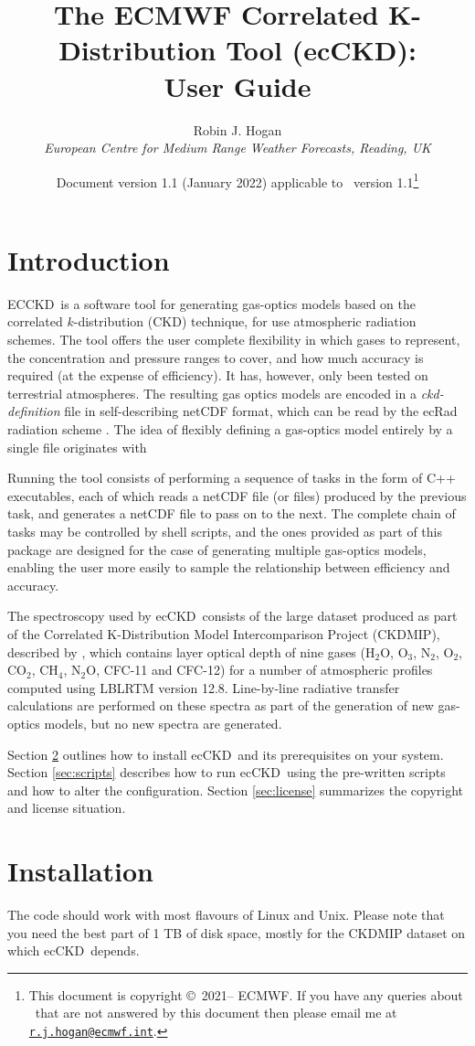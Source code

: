 \documentclass[a4,oneside]{article}
\title{The ECMWF Correlated K-Distribution Tool (ecCKD): \\ User Guide}
\author{Robin J. Hogan\\ \emph{European Centre for Medium Range
    Weather Forecasts, Reading, UK}}
\date{Document version 1.1 (January 2022) applicable to 
  \ecckd\ version 1.1\thanks{This document is copyright
    \copyright\ 2021-- ECMWF. If you have any queries about
    \ecckd\ that are not answered by this document
%
%
    then please email me at
    \href{mailto:r.j.hogan@ecmwf.int}{\texttt{r.j.hogan@ecmwf.int}}.}}
\newcommand{\ecckd}{ecCKD}
\newcommand{\Ecckd}{ECCKD}
\begin{document}
\maketitle

\section{Introduction}
\Ecckd\ is a software tool for generating gas-optics models based on
the correlated $k$-distribution (CKD) technique, for use atmospheric
radiation schemes. The tool offers the user complete flexibility in
which gases to represent, the concentration and pressure ranges to
cover, and how much accuracy is required (at the expense of
efficiency). It has, however, only been tested on terrestrial
atmospheres.  The resulting gas optics models are encoded in a
\emph{ckd-definition} file in self-describing netCDF format,
which can be read by the ecRad radiation scheme
\citep{Hogan&2018}. The idea of flexibly defining a gas-optics model
entirely by a single file originates with \cite{Edwards&1996}

Running the tool consists of performing a sequence of tasks in the
form of C++ executables, each of which reads a netCDF file (or files)
produced by the previous task, and generates a netCDF file to pass on
to the next. The complete chain of tasks may be controlled by shell
scripts, and the ones provided as part of this package are designed
for the case of generating multiple gas-optics models, enabling the
user more easily to sample the relationship between efficiency and
accuracy.

The spectroscopy used by \ecckd\ consists of the large dataset
produced as part of the Correlated K-Distribution Model
Intercomparison Project (CKDMIP), described by \cite{Hogan&2020},
which contains layer optical depth of nine gases (H$_2$O, O$_3$,
N$_2$, O$_2$, CO$_2$, CH$_4$, N$_2$O, CFC-11 and CFC-12) for a number
of atmospheric profiles computed using LBLRTM version
12.8. Line-by-line radiative transfer calculations are performed on
these spectra as part of the generation of new gas-optics models, but
no new spectra are generated.

Section \ref{sec:installation} outlines how to install \ecckd\ and its
prerequisites on your system. Section \ref{sec:scripts} describes how
to run \ecckd\ using the pre-written scripts and how to alter the
configuration. Section \ref{sec:license} summarizes the copyright
and license situation.

\section{Installation}
\label{sec:installation}
The code should work with most flavours of Linux and Unix. Please note
that you need the best part of 1 TB of disk space, mostly for the
CKDMIP dataset on which \ecckd\ depends.
\end{document}
